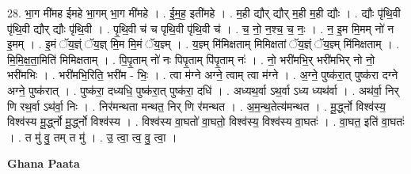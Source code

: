 \documentclass[17pt]{extarticle}
\begin{document}
28. भा॒ग मी॑मह ईमहे भा॒गम् भा॒ग मी॑महे । . ई॒म॒ह॒ इती॑महे । . म॒ही द्यौर् द्यौर् म॒ही म॒ही द्यौः । . द्यौः पृ॑थि॒वी पृ॑थि॒वी द्यौर् द्यौः पृ॑थि॒वी । . पृ॒थि॒वी च॑ च पृथि॒वी पृ॑थि॒वी च॑ । . च॒ नो॒ न॒श्च॒ च॒ नः॒ । . न॒ इ॒म मि॒मम् नो॑ न इ॒मम् । . इ॒मं ॅय॒ज्ञ्ं ॅय॒ज्ञ् मि॒म मि॒मं ॅय॒ज्ञ्म् । . य॒ज्ञ्म् मि॑मिक्षताम् मिमिक्षतां ॅय॒ज्ञ्ं ॅय॒ज्ञ्म् मि॑मिक्षताम् । . मि॒मि॒क्ष॒ता॒मिति॑ मिमिक्षताम् । . पि॒पृ॒ताम् नो॑ नः पिपृ॒ताम् पि॑पृ॒ताम् नः॑ । . नो॒ भरी॑मभि॒र् भरी॑मभिर् नो नो॒ भरी॑मभिः । . भरी॑मभि॒रिति॒ भरी॑म - भिः॒ । . त्वा म॑ग्ने अग्ने॒ त्वाम् त्वा म॑ग्ने । . अ॒ग्ने॒ पुष्क॑रा॒त् पुष्क॑रा दग्ने अग्ने॒ पुष्क॑रात् । . पुष्क॑रा॒ दध्यधि॒ पुष्क॑रा॒त् पुष्क॑रा॒ दधि॑ । . अध्यथ॒र्वा ऽथ॒र्वा ऽध्य ध्यथ॑र्वा । . अथ॑र्वा॒ निर् णि रथ॒र्वा ऽथ॑र्वा॒ निः । . निर॑मन्थता मन्थत॒ निर् णि र॑मन्थत । . अ॒म॒न्थ॒तेत्य॑मन्थत । . मू॒र्द्ध्नो विश्व॑स्य॒ विश्व॑स्य मू॒र्द्ध्नो मू॒र्द्ध्नो विश्व॑स्य । . विश्व॑स्य वा॒घतो॑ वा॒घतो॒ विश्व॑स्य॒ विश्व॑स्य वा॒घतः॑ । . वा॒घत॒ इति॑ वा॒घतः॑ । . त मु॑ वु॒ तम् त मु॑ । . उ॒ त्वा॒ त्व॒ वु॒ त्वा॒ । \newline

\textbf{Ghana Paata } \newline
\end{document}
